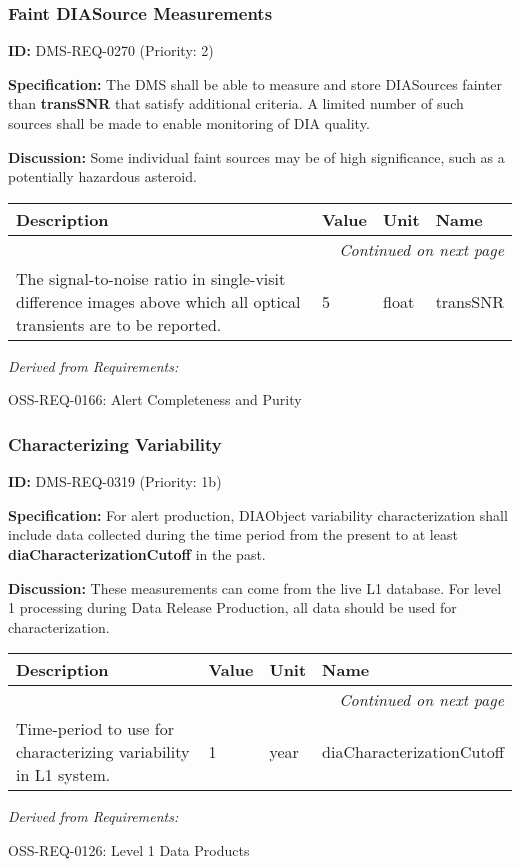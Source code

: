 \documentclass[SE,toc,lsstdraft]{lsstdoc}
\makeatletter
\newcommand{\paramname}[1]{\hspace{0pt}#1}
\newcommand{\unitname}[1]{\hspace{0pt}#1}
\newenvironment{parameters}[0]{%
\setlength\LTleft{0pt}
\setlength\LTright{\fill}
\begin{small}
\begin{longtable}[]{|p{0.49\textwidth}|l|p{0.6in}|p{1.70in}@{}|}

\hline \textbf{Description} & \textbf{Value} & \textbf{Unit} & \textbf{Name} \\ \hline
\endhead

\hline \multicolumn{4}{r}{\emph{Continued on next page}} \\
\endfoot

\hline\hline
\endlastfoot
}{%
\hline
\end{longtable}
\end{small}
}
\makeatother
\begin{document}
\subsubsection{Faint DIASource Measurements}

\label{DMS-REQ-0270}
\textbf{ID:} DMS-REQ-0270 (Priority: 2)

\textbf{Specification:} The DMS shall be able to measure and store DIASources fainter than \textbf{transSNR }that satisfy additional criteria. A limited number of such sources shall be made to enable monitoring of DIA quality.

\textbf{Discussion: }Some individual faint sources may be of high significance, such as a potentially hazardous asteroid.

\begin{parameters}
The signal-to-noise ratio in single-visit difference images above which all optical transients are to be reported.
&
5
&
\unitname{%
float
}
&
\paramname{%
transSNR
} \\\hline
\end{parameters}

\emph{Derived from Requirements:}

OSS-REQ-0166:
Alert Completeness and Purity \newline

\subsubsection{Characterizing Variability}

\label{DMS-REQ-0319}
\textbf{ID:} DMS-REQ-0319 (Priority: 1b)

\textbf{Specification:} For alert production, DIAObject variability characterization shall include data collected during the time period from the present to at least \textbf{diaCharacterizationCutoff} in the past.

\textbf{Discussion:} These measurements can come from the live L1 database. For level 1 processing during Data Release Production, all data should be used for characterization.

\begin{parameters}
Time-period to use for characterizing variability in L1 system.
&
1
&
\unitname{%
year
}
&
\paramname{%
diaCharacterizationCutoff
} \\\hline
\end{parameters}

\emph{Derived from Requirements:}

OSS-REQ-0126:
Level 1 Data Products \newline
\end{document}
